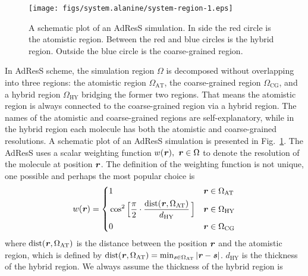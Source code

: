 \documentclass[epjST]{svjour}
\newcommand{\vect}[1]{\textbf{\textit{#1}}}
\newcommand{\dist}[0]{\textrm {dist}}
\newcommand{\AT}[0]{\textrm{AT}}
\newcommand{\HY}[0]{\textrm{HY}}
\newcommand{\CG}[0]{\textrm{CG}}
\begin{document}
\begin{figure}
  \centering
  \texttt{[image: figs/system.alanine/system-region-1.eps]}
  \caption{A schematic plot of an AdResS simulation. In side the red circle is the atomistic region. Between the red and blue circles is the hybrid region. Outside the blue circle is the coarse-grained region.}
  \label{fig:sys-region}
\end{figure}

In AdResS scheme, the simulation region $\Omega$ is 
decomposed without overlapping into three regions:
the atomistic region $\Omega_\AT$, the coarse-grained region $\Omega_\CG$, and
a hybrid region $\Omega_\HY$ bridging the former two regions.
That means the atomistic region is always connected to the coarse-grained region via a hybrid region.
The names of the atomistic and coarse-grained regions are self-explanatory, while
in the hybrid region each molecule has both the atomistic and coarse-grained resolutions.
A schematic plot of an AdResS simulation is presented in Fig.~\ref{fig:sys-region}.
The AdResS uses a scalar weighting function $w(\vect r),\ \vect r\in\Omega$ 
to denote the resolution of the molecule at position $\vect r$.
The definition of the weighting function
is not unique, one possible and perhaps the most popular choice is
\begin{equation}\label{eqn:old-w}
  w(\vect r) =
  \left\{
    \begin{alignedat}{3}
      &1 &\quad& \vect r \in \Omega_\AT\\
      &\cos^2\Big[\frac{\pi}{2 } \cdot \frac{\dist(\vect r, \Omega_\AT)}{d_\HY}\,\Big] && \vect r \in\Omega_\HY \\
      &0 &    & \vect r \in \Omega_\CG 
    \end{alignedat}
  \right.
\end{equation}
where $\dist(\vect r, \Omega_\AT)$ is the distance between the
position $\vect r$ and the atomistic region, which is defined
by $\dist(\vect r, \Omega_\AT) = \min_{\vect s\in\Omega_\AT} \vert
\vect r - \vect s \vert$.  $d_\HY$ is the thickness of the hybrid
region. We always assume the thickness of the hybrid region is
\end{document}
